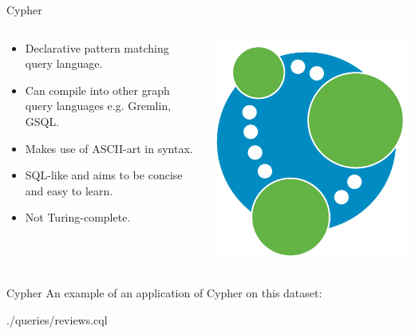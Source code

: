 \begin{frame}{Cypher}
    \begin{columns}
        \begin{column}{.6\textwidth}
            \begin{itemize}
                \item Declarative pattern matching query language.
                \item Can compile into other graph query languages e.g. Gremlin, GSQL.
                \item Makes use of ASCII-art in syntax.
                \item SQL-like and aims to be concise and easy to learn.
                \item Not Turing-complete.
            \end{itemize}
            \end{column}%
            \hfill%
            \begin{column}{.39\textwidth}
            \centering
            \includegraphics[width=0.7\columnwidth]{img/graph-lang/neo4j.png}
        \end{column}%
    \end{columns}
\end{frame}

\begin{frame}{Cypher}
    An example of an application of Cypher on this dataset:

    {./queries/reviews.cql}
\end{frame}

